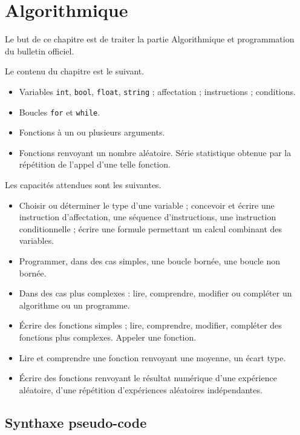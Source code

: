 
\chapter{Algorithmique}

Le but de ce chapitre est de traiter la partie \og Algorithmique et programmation \fg~ du bulletin officiel.

Le contenu du chapitre est le suivant.
	\begin{itemize}
		\item Variables \texttt{int}, \texttt{bool}, \texttt{float}, \texttt{string} ; affectation ; instructions ; conditions.
		\item Boucles \texttt{for} et \texttt{while}.
		\item Fonctions à un ou plusieurs arguments.
		\item Fonctions renvoyant un nombre aléatoire. Série statistique obtenue par la répétition de l'appel d'une telle fonction.
	\end{itemize}

Les capacités attendues sont les suivantes.
	\begin{itemize}
		\item Choisir ou déterminer le type d'une variable ; concevoir et écrire une instruction d'affectation, une séquence d'instructions, une instruction conditionnelle ; écrire une formule permettant un calcul combinant des variables.
		\item Programmer, dans des cas simples, une boucle bornée, une boucle non bornée.
		\item Dans des cas plus complexes : lire, comprendre, modifier ou compléter un algorithme ou un programme.
		\item Écrire des fonctions simples ; lire, comprendre, modifier, compléter des fonctions plus complexes. Appeler une fonction.
		\item Lire et comprendre une fonction renvoyant une moyenne, un écart type.
		\item Écrire des fonctions renvoyant le résultat numérique d'une expérience aléatoire, d'une répétition d'expériences aléatoires indépendantes.
	\end{itemize}

\section{Synthaxe pseudo-code}



